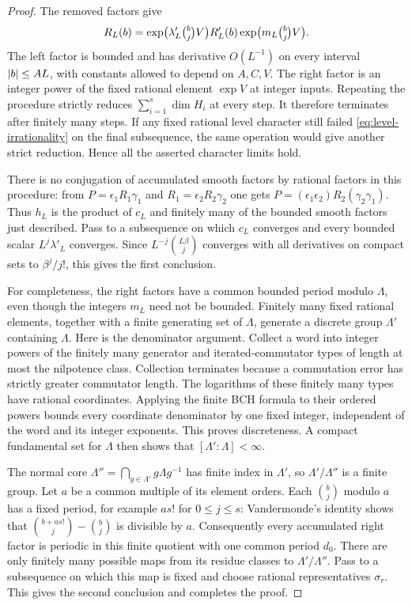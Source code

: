 \begin{proof}
The removed factors give
\[
 R_L(b)=
 \exp\bigl(\lambda'_L\tbinom bj V\bigr)
 R'_L(b)
 \exp\bigl(m_L\tbinom bj V\bigr).
\]
The left factor is bounded and has derivative $O(L^{-1})$ on every
interval $\lvert b\rvert\leq A L$, with constants allowed to depend on $A,C,V$.
The right factor is an integer power of the fixed rational element
$\exp V$ at integer inputs.  Repeating the procedure strictly reduces
$\sum_{i=1}^s\dim H_i$ at every step.  It therefore terminates after
finitely many steps.  If any fixed rational level character still failed
\eqref{eq:level-irrationality} on the final subsequence, the same operation
would give another strict reduction.  Hence all the asserted character
limits hold.

There is no conjugation of accumulated smooth factors by rational factors
in this procedure: from
$P=\epsilon_1R_1\gamma_1$ and
$R_1=\epsilon_2R_2\gamma_2$ one gets
$P=(\epsilon_1\epsilon_2)R_2(\gamma_2\gamma_1)$.
Thus $h_L$ is the product of $c_L$ and finitely many of the bounded smooth
factors just described.  Pass to a subsequence on which $c_L$ converges
and every bounded scalar $L^j\lambda'_L$ converges.  Since
$L^{-j}\binom{L\beta}{j}$ converges with all derivatives on compact sets
to $\beta^j/j!$, this gives the first conclusion.

For completeness, the right factors have a common bounded period modulo
$\Lambda$, even though the integers $m_L$ need not be bounded.  Finitely
many fixed rational elements, together with a finite generating set of
$\Lambda$, generate a discrete group $\Lambda'$ containing $\Lambda$.
Here is the denominator argument.  Collect a word into integer powers of
the finitely many generator and iterated-commutator types of length at most
the nilpotence class.  Collection terminates because a commutation error
has strictly greater commutator length.  The logarithms of these finitely
many types have rational coordinates.  Applying the finite BCH formula to
their ordered powers bounds every coordinate denominator by one fixed
integer, independent of the word and its integer exponents.  This proves
discreteness.  A compact fundamental set for $\Lambda$ then shows that
$[\Lambda':\Lambda]<\infty$.

The normal core $\Lambda''=\bigcap_{g\in\Lambda'}g\Lambda g^{-1}$ has
finite index in $\Lambda'$, so $\Lambda'/\Lambda''$ is a finite group.
Let $a$ be a common multiple of its element orders.  Each
$\binom bj$ modulo $a$ has a fixed period, for example $a s!$ for
$0\leq j\leq s$: Vandermonde's identity shows that
$\binom{b+a s!}{j}-\binom bj$ is divisible by $a$.
Consequently every accumulated right factor is periodic in this finite
quotient with one common period $d_0$.  There are only finitely many
possible maps from its residue classes to $\Lambda'/\Lambda''$.
Pass to a subsequence on which this map is fixed and choose rational
representatives $\sigma_r$.  This gives the second conclusion and
completes the proof.
\end{proof}

